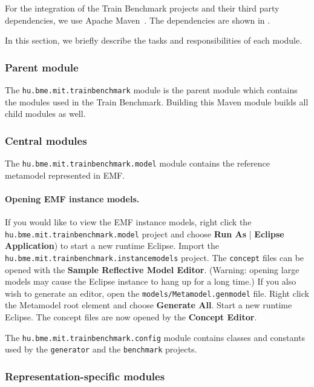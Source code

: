 For the integration of the Train Benchmark projects and their third party dependencies, we use Apache Maven~\cite{Maven}. The dependencies are shown in .

In this section, we briefly describe the tasks and responsibilities of each module.

\subsubsection{Parent module}

The \texttt{hu.bme.mit.trainbenchmark} module is the parent module which contains the modules used in the Train Benchmark. Building this Maven module builds all child modules as well.

\subsubsection{Central modules}

The \texttt{hu.bme.mit.trainbenchmark.model} module contains the reference metamodel represented in EMF.

\paragraph{Opening EMF instance models.} If you would like to view the EMF instance models, right click the \texttt{hu.bme.mit.trainbenchmark.model} project and choose \textbf{Run As} | \textbf{Eclipse Application}) to start a new runtime Eclipse. Import the \texttt{hu.bme.mit.trainbenchmark.instancemodels} project. The \texttt{concept} files can be opened with the \textbf{Sample Reflective Model Editor}. (Warning: opening large models may cause the Eclipse instance to hang up for a long time.) If you also wish to generate an editor, open the \texttt{models/Metamodel.genmodel} file. Right click the \textsf{Metamodel} root element and choose \textbf{Generate All}. Start a new runtime Eclipse. The \textsf{concept} files are now opened by the \textbf{Concept Editor}.

The \texttt{hu.bme.mit.trainbenchmark.config} module contains classes and constants used by the \texttt{generator} and the \texttt{benchmark} projects.


\subsubsection{Representation-specific modules}

